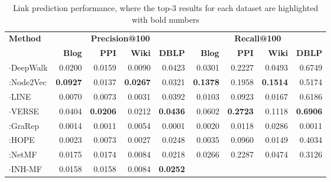 \documentclass[conference]{IEEEtran}
\begin{document}
\begin{table*}[htbp]\small \vspace{-4pt}
\caption{Link prediction performance, where the top-3 results for each dataset are highlighted with bold numbers
}
\label{res_link}
\centering
\vspace{-4pt}
\begin{tabular}{l|rrrr|rrrr}
\hline
\multirow{2}{*}{\textbf{Method}} & \multicolumn{4}{c|}{\textbf{Precision@100}}                                   & \multicolumn{4}{c|}{\textbf{Recall@100}}
\\ \cline{2-9} & \textbf{Blog}            & \textbf{PPI}             & \textbf{Wiki}            & \multicolumn{1}{r|}{\textbf{DBLP}}
& \textbf{Blog}            & \textbf{PPI}             & \textbf{Wiki}            & \multicolumn{1}{r|}{\textbf{DBLP}}
\\ \hline
$\cdot$DeepWalk                 & 0.0200          & 0.0159          & 0.0090          & 0.0423                    
& 0.0301          & 0.2227          & 0.0493          & 0.6749                    
\\
:Node2Vec                 & \textbf{0.0927} & 0.0137          & \textbf{0.0267} & 0.0321                    
& \textbf{0.1378} & 0.1958          & \textbf{0.1514} & 0.5174                    
\\
$\cdot$LINE                     & 0.0070          & 0.0073          & 0.0031          & 0.0392                    
& 0.0103          & 0.0923          & 0.0167          & 0.6186                    
\\
$\cdot$VERSE                    & 0.0404          & \textbf{0.0206}   & 0.0212          & \textbf{0.0436}           
& 0.0602          & \textbf{0.2723}          & 0.1118          & \textbf{0.6906}           
\\ \hline
:GraRep                   & 0.0014          & 0.0011          & 0.0054          & 0.0001                    
& 0.0020          & 0.0118          & 0.0286          & 0.0011                   
\\
:HOPE                     & 0.0023          & 0.0073          & 0.0027          & 0.0248                    
& 0.0035          & 0.0960          & 0.0149          & 0.4034                    
\\
:NetMF                    & 0.0175          & 0.0174		   & 0.0084          & 0.0218                    
& 0.0266          & 0.2287 & 0.0474          & 0.3126                    
\\ \hline
$\cdot$INH-MF                   & 0.0158 & 0.0158 & 0.0084 & \textbf{0.0252}           

\end{tabular}
\end{table*}
\end{document}
